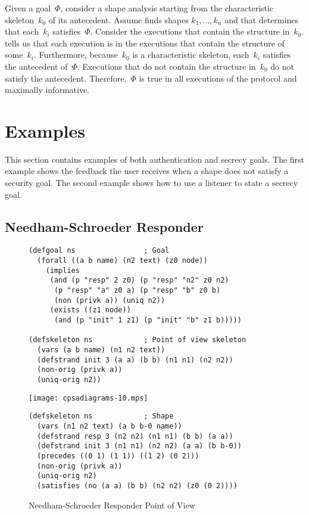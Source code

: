 \documentclass[12pt]{article}
\begin{document}
Given a goal~\(\Phi\), consider a shape analysis starting from the
characteristic skeleton~$k_0$ of its antecedent.  Assume {\cpsa} finds
shapes $k_1,\ldots,k_n$ and that {\cpsa} determines that each~$k_i$
satisfies~$\Phi$.  Consider the executions that contain the structure
in~$k_0$.  {\cpsa} tells us that each execution is in the executions
that contain the structure of some~$k_i$.  Furthermore, because~$k_0$
is a characteristic skeleton, each~$k_i$ satisfies the antecedent
of~$\Phi$.  Executions that do not contain the structure in~$k_0$ do
not satisfy the antecedent.  Therefore,~$\Phi$ is true in all
executions of the protocol and maximally informative.

\section{Examples}\label{sec:examples}

This section contains examples of both authentication and secrecy
goals.  The first example shows the feedback the user receives when a
shape does not satisfy a security goal.  The second example shows how
to use a listener to state a secrecy goal.

\subsection{Needham-Schroeder Responder}\label{sec:ns resp}

\begin{figure}
\begin{verbatim}
(defgoal ns                ; Goal
  (forall ((a b name) (n2 text) (z0 node))
    (implies
     (and (p "resp" 2 z0) (p "resp" "n2" z0 n2)
      (p "resp" "a" z0 a) (p "resp" "b" z0 b)
      (non (privk a)) (uniq n2))
     (exists ((z1 node))
      (and (p "init" 1 z1) (p "init" "b" z1 b)))))

(defskeleton ns            ; Point of view skeleton
  (vars (a b name) (n1 n2 text))
  (defstrand init 3 (a a) (b b) (n1 n1) (n2 n2))
  (non-orig (privk a))
  (uniq-orig n2))
\end{verbatim}
\begin{center}
\texttt{[image: cpsadiagrams-10.mps]}
\end{center}
\begin{verbatim}
(defskeleton ns            ; Shape
  (vars (n1 n2 text) (a b b-0 name))
  (defstrand resp 3 (n2 n2) (n1 n1) (b b) (a a))
  (defstrand init 3 (n1 n1) (n2 n2) (a a) (b b-0))
  (precedes ((0 1) (1 1)) ((1 2) (0 2)))
  (non-orig (privk a))
  (uniq-orig n2)
  (satisfies (no (a a) (b b) (n2 n2) (z0 (0 2))))
\end{verbatim}
\caption{Needham-Schroeder Responder Point of View}
\label{fig:ns resp}
\end{figure}
\end{document}

